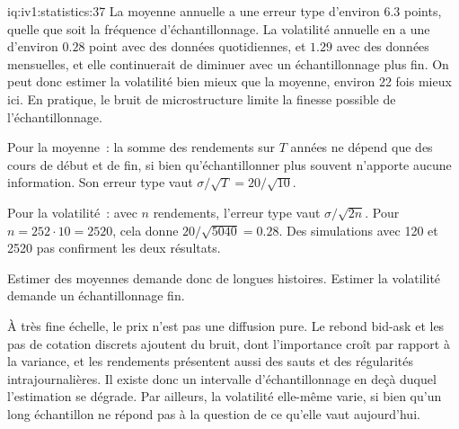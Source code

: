 \begin{solution}{iq:iv1:statistics:37}
La moyenne annuelle a une erreur type d'environ $6.3$ points, quelle que soit la fréquence d'échantillonnage. La volatilité annuelle en a une d'environ $0.28$ point avec des données quotidiennes, et $1.29$ avec des données mensuelles, et elle continuerait de diminuer avec un échantillonnage plus fin. On peut donc estimer la volatilité bien mieux que la moyenne, environ 22 fois mieux ici. En pratique, le bruit de microstructure limite la finesse possible de l'échantillonnage.

Pour la moyenne~: la somme des rendements sur $T$ années ne dépend que des cours de début et de fin, si bien qu'échantillonner plus souvent n'apporte aucune information. Son erreur type vaut $\sigma/\sqrt{T} = 20/\sqrt{10}$.

Pour la volatilité~: avec $n$ rendements, l'erreur type vaut $\sigma/\sqrt{2n}$. Pour $n = 252 \cdot 10 = 2520$, cela donne $20/\sqrt{5040} = 0.28$. Des simulations avec 120 et 2520 pas confirment les deux résultats.

Estimer des moyennes demande donc de longues histoires. Estimer la volatilité demande un échantillonnage fin.

À très fine échelle, le prix n'est pas une diffusion pure. Le rebond bid-ask et les pas de cotation discrets ajoutent du bruit, dont l'importance croît par rapport à la variance, et les rendements présentent aussi des sauts et des régularités intrajournalières. Il existe donc un intervalle d'échantillonnage en deçà duquel l'estimation se dégrade. Par ailleurs, la volatilité elle-même varie, si bien qu'un long échantillon ne répond pas à la question de ce qu'elle vaut aujourd'hui.

\end{solution}

